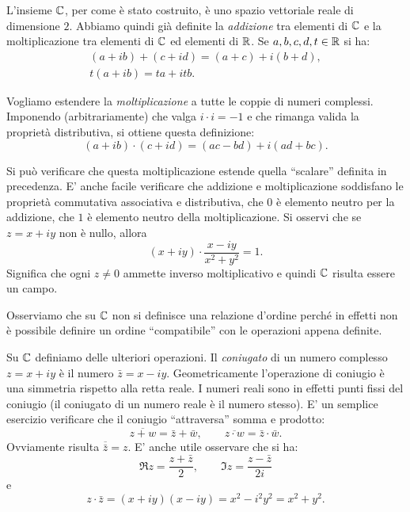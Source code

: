 L'insieme ${\mathbb C}$, per come
è stato costruito, è uno spazio vettoriale reale di dimensione $2$.
Abbiamo quindi già definite la \emph{addizione}%
%
tra elementi di ${\mathbb C}$ e la moltiplicazione
tra elementi di ${\mathbb C}$ ed elementi di ${\mathbb R}$.
Se $a,b,c,d,t\in {\mathbb R}$ si ha:
\begin{gather*}
 (a+ib) + (c+id) = (a+c) + i (b+d), \\
 t(a+ib) = ta + itb.
\end{gather*}

Vogliamo estendere la \emph{moltiplicazione}%
%
 a tutte le coppie di numeri complessi.
Imponendo (arbitrariamente) che valga $i\cdot i = -1$ e che rimanga
valida la proprietà distributiva, si ottiene
questa definizione:
\[
   (a+ib) \cdot (c+id) = (ac-bd) + i(ad+bc).
\]

Si può verificare che questa moltiplicazione estende quella ``scalare'' definita
in precedenza.
E' anche facile verificare che addizione e moltiplicazione soddisfano
le proprietà commutativa associativa e distributiva,
che $0$ è elemento neutro per la addizione, che $1$ è elemento neutro
della moltiplicazione.
Si osservi che se $z=x+iy$ non è nullo, allora
\[
  (x+iy) \cdot \frac{x-iy}{x^2+y^2} = 1.
\]
Significa che ogni $z\neq 0$ ammette inverso moltiplicativo e quindi ${\mathbb C}$
risulta essere un campo.

Osserviamo che su ${\mathbb C}$ non si definisce una relazione d'ordine perché
in effetti non è possibile definire un ordine ``compatibile'' con le operazioni
appena definite.%

Su ${\mathbb C}$ definiamo delle ulteriori operazioni.
Il \emph{coniugato}%
%
%
di un numero complesso $z=x+iy$ è il numero
$\bar z = x - iy$. Geometricamente l'operazione di coniugio è una simmetria
rispetto alla retta reale. I numeri reali sono in effetti punti fissi del
coniugio (il coniugato di un numero reale è il numero stesso).
E' un semplice esercizio verificare che il coniugio ``attraversa''
somma e prodotto:
\[
\overline{z+w} = \bar z + \bar w, \qquad
\overline{z\cdot w} = \bar z \cdot \bar w.
\]
Ovviamente risulta $\overline {\bar z} = z$.
E' anche utile osservare che si ha:
\begin{equation}\label{eq:re_im}
  \Re z = \frac{z+\bar z}{2}, \qquad
  \Im z = \frac{z-\bar z}{2i}
\end{equation}
e
\[
z \cdot \bar z = (x+iy)(x-iy) = x^2-i^2y^2 = x^2+y^2.
\]


